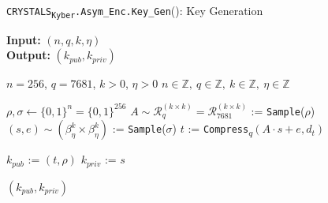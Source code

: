 \documentclass[runningheads]{llncs}
\numberwithin{equation}{section}
\begin{document}
    \vspace{-2.75ex}
    \begin{algorithm}
        \caption{\texorpdfstring{\texttt{CRYSTALS}\textsubscript{\texttt{Kyber}}\texttt{.Asym\_Enc}\texttt{.Key\_Gen}()}\/: Key Generation}
        \label{subrou:crystals-kyber-asymmetric-encryption-key-gen}
        
        \textbf{Input:} $\left( n, q, k, \eta \right)$\\
        \textbf{Output:} $\left( {k}_{pub}, {k}_{priv} \right)$
        
        \begin{algorithmic}[1]
            \Require $n = 256$, $q = 7681$, $k > 0$, $\eta > 0$
            \Ensure $n \in \mathbb{Z},\ q \in \mathbb{Z},\ k \in \mathbb{Z},\ \eta \in \mathbb{Z}$
        
            \vspace{2ex}
            
            \State $\rho, \sigma \gets { \{ 0 , 1 \} }^{n} = { \{ 0 , 1 \} }^{256}$
            \State $A \sim {\mathcal{R}}_{q}^{( k \times k )} = {\mathcal{R}}_{7681}^{( k \times k )}$ := \texttt{Sample}($\rho$)
            \State $(s, e) \sim \left( {\beta}_{\eta}^{k} \times {\beta}_{\eta}^{k} \right)$ := \texttt{Sample}($\sigma$)
            \State $t$ := \texttt{Compress}\textsubscript{$q$}$\left( A \cdot s + e, {d}_{t} \right)$
            
            \vspace{1ex}
            
            \State ${k}_{pub}$ := $(t, \rho)$
            \State ${k}_{priv}$ := $s$
            
            \vspace{1ex}
            
            \State \Return $\left( {k}_{pub}, {k}_{priv} \right)$
        \end{algorithmic}
    \end{algorithm}


    \newpage
\end{document}
